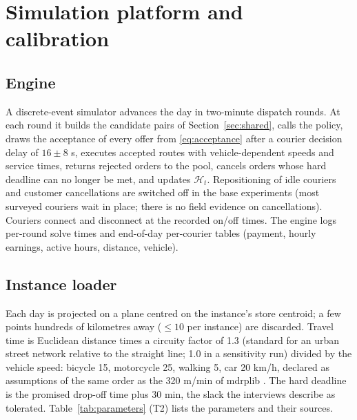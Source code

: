 \documentclass[preprint,12pt,authoryear]{elsarticle}%
\newcommand{\Hist}{\mathcal{H}}
\begin{document}
\section{Simulation platform and calibration}
\label{sec:platform}

\subsection{Engine}

A discrete-event simulator advances the day in two-minute dispatch rounds. At each round it builds the candidate pairs of Section~\ref{sec:shared}, calls the policy, draws the acceptance of every offer from \eqref{eq:acceptance} after a courier decision delay of $16 \pm 8$ s, executes accepted routes with vehicle-dependent speeds and service times, returns rejected orders to the pool, cancels orders whose hard deadline can no longer be met, and updates $\Hist_t$. Repositioning of idle couriers and customer cancellations are switched off in the base experiments (most surveyed couriers wait in place; there is no field evidence on cancellations). Couriers connect and disconnect at the recorded on/off times. The engine logs per-round solve times and end-of-day per-courier tables (payment, hourly earnings, active hours, distance, vehicle).

\subsection{Instance loader}

Each day is projected on a plane centred on the instance's store centroid; a few points hundreds of kilometres away ($\le 10$ per instance) are discarded. Travel time is Euclidean distance times a circuity factor of 1.3 (standard for an urban street network relative to the straight line; 1.0 in a sensitivity run) divided by the vehicle speed: bicycle 15, motorcycle 25, walking 5, car 20 km/h, declared as assumptions of the same order as the 320 m/min of mdrplib \citep{reyes2018meal}. The hard deadline is the promised drop-off time plus 30 min, the slack the interviews describe as tolerated. Table~\ref{tab:parameters} (T2) lists the parameters and their sources.
\end{document}
